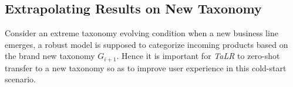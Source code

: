 


\subsection{Extrapolating Results on New Taxonomy}
\label{sec:new tax}

Consider an extreme taxonomy evolving condition when a new business line emerges, a robust model is supposed to categorize incoming products based on the brand new taxonomy $G_{i+1}$. Hence it is important for \textit{TaLR} to zero-shot transfer to a new taxonomy so as to improve user experience in this cold-start scenario.

